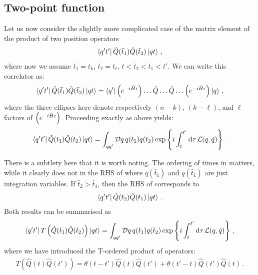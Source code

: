\documentclass[notes]{subfiles}
\begin{document}
\subsection{Two-point function}
\label{sec:two-point-function}

Let us now consider the slightly more complicated case of the matrix
element of the product of two position operators
\begin{align}
  \label{eq:TwoPtDef}
  \bra{q't'} \hat{Q}(\bar{t}_1) \hat{Q}(\bar{t}_2)\ket{qt}\, , 
\end{align}
where now we assume $\bar{t}_1=t_k$, $\bar{t}_2=t_\ell$,
$t<\bar{t}_2<\bar{t}_1<t'$. We can write this correlator as:
\begin{align}
    \bra{q't'} \hat{Q}(\bar{t}_1) \hat{Q}(\bar{t}_2)\ket{qt} = 
  \bra{q'} \left(e^{-i \hat{H} \epsilon}\right) \dots \hat{Q} \ldots \hat{Q} \ldots \left(e^{-i \hat{H} \epsilon}\right)
  \ket{q}\, ,
\end{align}
where the three ellipses here denote respectively $(n-k)$, $(k-\ell)$,
and $\ell$ factors of $\left(e^{-i \hat{H} \epsilon}\right)$. Proceeding exactly as above yields: 
\begin{align}
  \label{eq:TwoPtPathInt}
  \bra{q't'} \hat{Q}(\bar{t}_1) \hat{Q}(\bar{t}_2)\ket{qt} = 
  \int_{qq'} \mathcal{D}q\, q(\bar{t}_1) q(\bar{t}_2) 
  \exp \left\{
  i \int_t^{t'} \dd{\tau} \mathcal{L}(q,\dot{q})
  \right\}\, .
\end{align}

There is a subtlety here that it is worth noting. The ordering of
times in  matters, while it clearly does not in the
RHS of  where $q(\bar{t}_1)$ and $q(\bar{t}_1)$
are just integration variables. If $\bar{t}_2>\bar{t}_1$, then the RHS
of  corresponds to
\begin{align}
  \bra{q't'} \hat{Q}(\bar{t}_2) \hat{Q}(\bar{t}_1) \ket{qt}\, .
\end{align}
Both results can be summarised as
\begin{align}
  \label{eq:TOrderPathInt}
  \bra{q't'} T\left(\hat{Q}(\bar{t}_1) \hat{Q}(\bar{t}_2)
  \right)\ket{qt} = 
  \int_{qq'} \mathcal{D}q\, q(\bar{t}_1) q(\bar{t}_2) 
  \exp \left\{
  i \int_t^{t'} \dd{\tau} \mathcal{L}(q,\dot{q})
  \right\}\, ,
\end{align}
where we have introduced the T-ordered product of operators: 
\begin{align}
  \label{eq:TOrderDef}
   T\left(\hat{Q}(t) \hat{Q}(t')\right) = \theta(t-t') \hat{Q}(t)
  \hat{Q}(t') + \theta(t'-t) \hat{Q}(t') \hat{Q}(t)\, .
\end{align}
\end{document}

